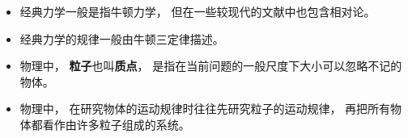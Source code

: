 
\begin{issues}
\issueDraft
\end{issues}

\begin{itemize}
\item 经典力学一般是指牛顿力学， 但在一些较现代的文献中也包含相对论。
\item 经典力学的规律一般由牛顿三定律描述。
\item 物理中， \textbf{粒子}也叫\textbf{质点}， 是指在当前问题的一般尺度下大小可以忽略不记的物体。
\item 物理中， 在研究物体的运动规律时往往先研究粒子的运动规律， 再把所有物体都看作由许多粒子组成的系统。
\end{itemize}
